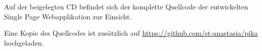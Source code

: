 




\clearpage\thispagestyle{empty}

Auf der beigelegten CD befindet sich der komplette Quellcode der entwickelten Single Page Webapplikation zur Einsicht.

Eine Kopie des Quellcodes ist zusätzlich auf \url{https://github.com/st-anastasia/pika} hochgeladen.

\clearpage\thispagestyle{empty}

\eigen  %












